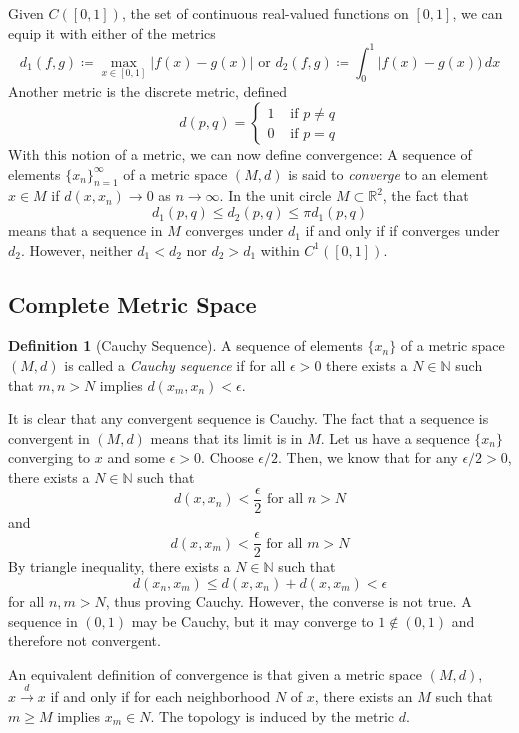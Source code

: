 \documentclass{article}
\theoremstyle{remark}
\theoremstyle{definition}
\newtheorem{definition}{Definition}[section]
\begin{document}
Given $C([0, 1])$, the set of continuous real-valued functions on $[0, 1]$, we can equip it with either of the metrics 
\[d_1 (f, g) \coloneqq \max_{x \in [0, 1]} \big| f(x) - g(x) \big| \text{ or } d_2 (f, g) \coloneqq \int_0^1 \big| f(x) - g(x) \big) \, dx\]
Another metric is the discrete metric, defined
\[d(p, q) = \begin{cases} 1 & \text{ if } p \neq q \\ 0 & \text{ if } p = q \end{cases}\]
With this notion of a metric, we can now define convergence: A sequence of elements $\{x_n\}_{n=1}^\infty$ of a metric space $(M, d)$ is said to \textit{converge} to an element $x \in M$ if $d(x, x_n) \rightarrow 0$ as $n \rightarrow \infty$. In the unit circle $M \subset \mathbb{R}^2$, the fact that 
\[d_1 (p, q) \leq d_2 (p, q) \leq \pi d_1 (p, q)\]
means that a sequence in $M$ converges under $d_1$ if and only if if converges under $d_2$. However, neither $d_1 < d_2$ nor $d_2 > d_1$ within $C^1 ([0, 1])$. 

\subsection{Complete Metric Space}

\begin{definition}[Cauchy Sequence]
A sequence of elements $\{x_n\}$ of a metric space $(M, d)$ is called a \textit{Cauchy sequence} if for all $\epsilon > 0$ there exists a $N \in \mathbb{N}$ such that $m, n > N$ implies $d(x_m, x_n) < \epsilon$. 
\end{definition}

It is clear that any convergent sequence is Cauchy. The fact that a sequence is convergent in $(M, d)$ means that its limit is in $M$. Let us have a sequence $\{x_n\}$ converging to $x$ and some $\epsilon > 0$. Choose $\epsilon/2$. Then, we know that for any $\epsilon/2 > 0$, there exists a $N \in \mathbb{N}$ such that 
\[d(x, x_n) < \frac{\epsilon}{2} \text{ for all } n > N\]
and 
\[d(x, x_m) < \frac{\epsilon}{2} \text{ for all } m > N\]
By triangle inequality, there exists a $N \in \mathbb{N}$ such that 
\[d(x_n, x_m) \leq d(x, x_n) + d(x, x_m) < \epsilon\]
for all $n, m > N$, thus proving Cauchy. However, the converse is not true. A sequence in $(0, 1)$ may be Cauchy, but it may converge to $1 \not\in (0, 1)$ and therefore not convergent. 

An equivalent definition of convergence is that given a metric space $(M, d)$, $x \xrightarrow{d} x$ if and only if for each neighborhood $N$ of $x$, there exists an $M$ such that $m \geq M$ implies $x_m \in N$. The topology is induced by the metric $d$. 
\end{document}
